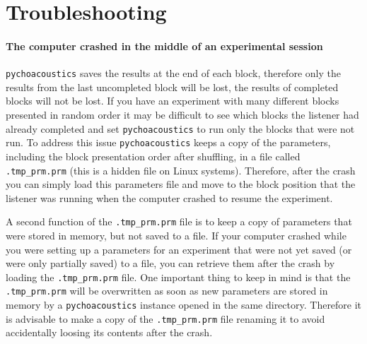 \chapter{Troubleshooting}

\subsubsection{The computer crashed in the middle of an experimental session}
\texttt{pychoacoustics} saves the results at the end of each block, therefore  only the results from the last uncompleted block will be lost, the results of completed blocks will not be lost. If you have an experiment with many different blocks presented in random order it may be difficult to see which blocks the listener had already completed and set \texttt{pychoacoustics} to run only the blocks that were not run. To address this issue \texttt{pychoacoustics} keeps a copy of the parameters, including the block presentation order after shuffling, in a file called \texttt{.tmp\_prm.prm} (this is a hidden file on Linux systems). Therefore, after the crash you can simply load this parameters file and move to the block position that the listener was running when the computer crashed to resume the experiment. 

A second function of the \texttt{.tmp\_prm.prm} file is to keep a copy of parameters that were stored in memory, but not saved to a file. If your computer crashed while you were setting up a parameters for an experiment that were not yet saved (or were only partially saved) to a file, you can retrieve them after the crash by loading the \texttt{.tmp\_prm.prm} file. One important thing to keep in mind is that the \texttt{.tmp\_prm.prm} will be overwritten as soon as new parameters are stored in memory by a \texttt{pychoacoustics} instance opened in the same directory. Therefore it is advisable to make a copy of the \texttt{.tmp\_prm.prm} file renaming it to avoid accidentally loosing its contents after the crash.



